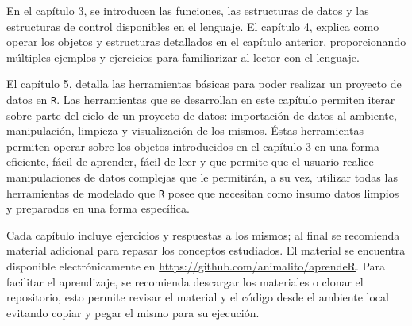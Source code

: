 \documentclass[]{article}
\begin{document}
En el capítulo 3, se introducen las funciones, las estructuras de datos
y las estructuras de control disponibles en el lenguaje. El capítulo 4,
explica como operar los objetos y estructuras detallados en el capítulo
anterior, proporcionando múltiples ejemplos y ejercicios para
familiarizar al lector con el lenguaje.

El capítulo 5, detalla las herramientas básicas para poder realizar un
proyecto de datos en \texttt{R}. Las herramientas que se desarrollan en
este capítulo permiten iterar sobre parte del ciclo de un proyecto de
datos: importación de datos al ambiente, manipulación, limpieza y
visualización de los mismos. Éstas herramientas permiten operar sobre
los objetos introducidos en el capítulo 3 en una forma eficiente, fácil
de aprender, fácil de leer y que permite que el usuario realice
manipulaciones de datos complejas que le permitirán, a su vez, utilizar
todas las herramientas de modelado que \texttt{R} posee que necesitan
como insumo datos limpios y preparados en una forma específica.

Cada capítulo incluye ejercicios y respuestas a los mismos; al final se
recomienda material adicional para repasar los conceptos estudiados. El
material se encuentra disponible electrónicamente en
\url{https://github.com/animalito/aprendeR}. Para facilitar el
aprendizaje, se recomienda descargar los materiales o clonar el
repositorio, esto permite revisar el material y el código desde el
ambiente local evitando copiar y pegar el mismo para su ejecución.
\end{document}
